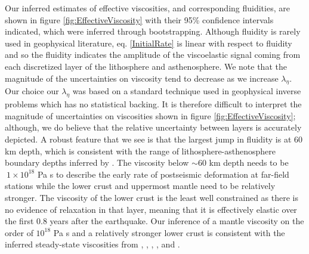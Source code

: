 \documentclass[1p]{elsarticle}
\begin{document}
Our inferred estimates of effective viscosities, and corresponding fluidities, are shown in figure \ref{fig:EffectiveViscosity} with their 95\% confidence intervals indicated, which were inferred through bootstrapping. Although fluidity is rarely used in geophysical literature, eq. \ref{InitialRate} is linear with respect to fluidity and so the fluidity indicates the amplitude of the viscoelastic signal coming from each discretized layer of the lithosphere and asthenosphere.  We note that the magnitude of the uncertainties on viscosity tend to decrease as we increase $\lambda_\eta$. Our choice our $\lambda_\eta$ was based on a standard technique used in geophysical inverse problems which has no statistical backing.  It is therefore difficult to interpret the magnitude of uncertainties on viscosities shown in figure \ref{fig:EffectiveViscosity}; although, we do believe that the relative uncertainty between layers is accurately depicted. A robust feature that we see is that the largest jump in fluidity is at 60 km depth, which is consistent with the range of lithosphere-asthenosphere boundary depths inferred by \citet{Lekic2011}.  The viscosity below $\sim60$ km depth needs to be $~1\times10^{18}$ Pa s to describe the early rate of postseismic deformation at far-field stations while the lower crust and uppermost mantle need to be relatively stronger.  The viscosity of the lower crust is the least well constrained as there is no evidence of relaxation in that layer, meaning that it is effectively elastic over the first 0.8 years after the earthquake.  Our inference of a mantle viscosity on the order of $10^{18}$ Pa s and a relatively stronger lower crust is consistent with the inferred steady-state viscosities from \citet{Pollitz2000}, \citet{Pollitz2003}, \citet{Johnson2007}, \citet{Spinler2015}, and \citet{Rollins2015}.  
\end{document}
